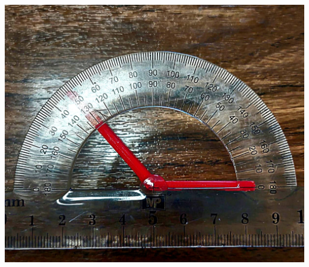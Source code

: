 \documentclass{beamer}
\begin{document}
\begin{frame}
\begin{minipage}{0.2\textwidth}
	\end{minipage}
	\hspace{0.5cm} %
	\begin{minipage}{0.25\textwidth}
		\centering
		\includegraphics[width=\textwidth]{figs/rotation.jpeg}
	\end{minipage}
	
	\vspace{0.5cm} %
	

\end{frame}
\end{document}
